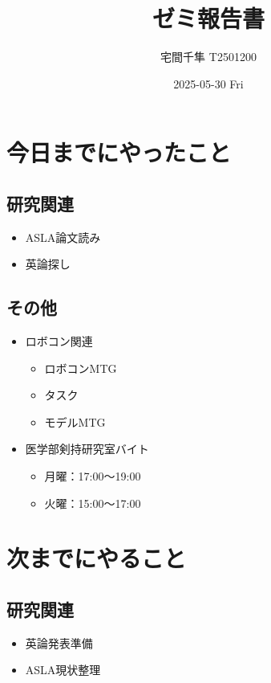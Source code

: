 \documentclass[uplatex, onecolumn, 10pt]{jsarticle}
\begin{document}
\title{\vspace{-40mm}\bf{\LARGE{ゼミ報告書}}}
\author{\vspace{-40mm}宅間千隼 T2501200}
\date{2025-05-30 Fri}
\maketitle


\section{今日までにやったこと}

\subsection*{研究関連} 
\begin{itemize}
	\item ASLA論文読み
	\item 英論探し
\end{itemize}

\subsection*{その他}
\begin{itemize}
	\item ロボコン関連
	\begin{itemize}
		\item ロボコンMTG
		\item タスク
		\item モデルMTG
	\end{itemize}
	\item 医学部剣持研究室バイト
	\begin{itemize}
		\item 月曜：17:00～19:00
		\item 火曜：15:00～17:00
	\end{itemize}
\end{itemize}


\section{次までにやること}

\subsection*{研究関連}
\begin{itemize}
	\item 英論発表準備
	\item ASLA現状整理
\end{itemize}
\end{document}
